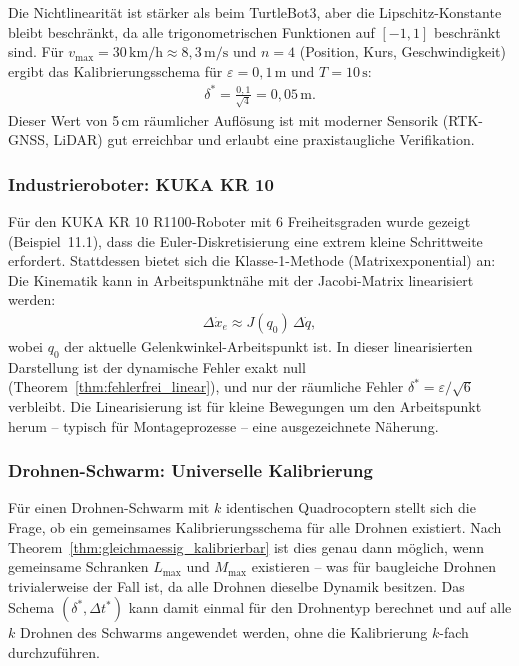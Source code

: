 ﻿\documentclass[a4paper,12pt]{article}
\theoremstyle{definition}
\begin{document}
Die Nichtlinearität ist stärker als beim TurtleBot3, aber die Lipschitz-Konstante bleibt beschränkt, da alle trigonometrischen Funktionen auf $[-1, 1]$ beschränkt sind. Für $v_{\max} = 30\,\text{km/h} \approx 8{,}3\,\text{m/s}$ und $n = 4$ (Position, Kurs, Geschwindigkeit) ergibt das Kalibrierungsschema für $\varepsilon = 0{,}1\,\text{m}$ und $T = 10\,\text{s}$:
\begin{align}
  \delta^* = \frac{0{,}1}{\sqrt{4}} = 0{,}05\,\text{m}.
\end{align}
Dieser Wert von 5\,cm räumlicher Auflösung ist mit moderner Sensorik (RTK-GNSS, LiDAR) gut erreichbar und erlaubt eine praxistaugliche Verifikation.

\subsubsection{Industrieroboter: KUKA KR 10}

Für den KUKA KR 10 R1100-Roboter mit 6 Freiheitsgraden wurde gezeigt (Beispiel~11.1), dass die Euler-Diskretisierung eine extrem kleine Schrittweite erfordert. Stattdessen bietet sich die Klasse-1-Methode (Matrixexponential) an: Die Kinematik kann in Arbeitspunktnähe mit der Jacobi-Matrix linearisiert werden:
\begin{align}
  \Delta\dot{x}_e \approx J(q_0)\,\Delta\dot{q},
\end{align}
wobei $q_0$ der aktuelle Gelenkwinkel-Arbeitspunkt ist. In dieser linearisierten Darstellung ist der dynamische Fehler exakt null (Theorem~\ref{thm:fehlerfrei_linear}), und nur der räumliche Fehler $\delta^* = \varepsilon/\sqrt{6}$ verbleibt. Die Linearisierung ist für kleine Bewegungen um den Arbeitspunkt herum -- typisch für Montageprozesse -- eine ausgezeichnete Näherung.

\subsubsection{Drohnen-Schwarm: Universelle Kalibrierung}

Für einen Drohnen-Schwarm mit $k$ identischen Quadrocoptern stellt sich die Frage, ob ein gemeinsames Kalibrierungsschema für alle Drohnen existiert. Nach Theorem~\ref{thm:gleichmaessig_kalibrierbar} ist dies genau dann möglich, wenn gemeinsame Schranken $L_{\max}$ und $M_{\max}$ existieren -- was für baugleiche Drohnen trivialerweise der Fall ist, da alle Drohnen dieselbe Dynamik besitzen. Das Schema $(\delta^*, \Delta t^*)$ kann damit einmal für den Drohnentyp berechnet und auf alle $k$ Drohnen des Schwarms angewendet werden, ohne die Kalibrierung $k$-fach durchzuführen.
\end{document}
